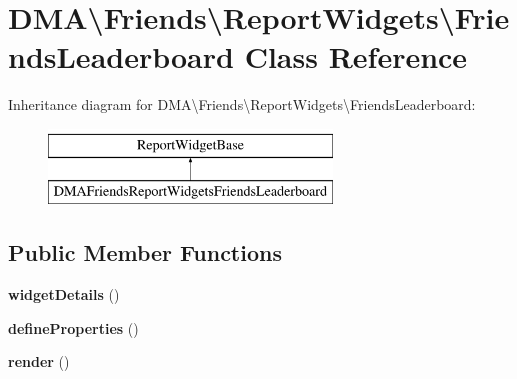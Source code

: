 \hypertarget{classDMA_1_1Friends_1_1ReportWidgets_1_1FriendsLeaderboard}{\section{D\-M\-A\textbackslash{}Friends\textbackslash{}Report\-Widgets\textbackslash{}Friends\-Leaderboard Class Reference}
\label{classDMA_1_1Friends_1_1ReportWidgets_1_1FriendsLeaderboard}
}
Inheritance diagram for D\-M\-A\textbackslash{}Friends\textbackslash{}Report\-Widgets\textbackslash{}Friends\-Leaderboard\-:\begin{figure}[H]
\begin{center}
\leavevmode
\includegraphics[height=2.000000cm]{dd/dbd/classDMA_1_1Friends_1_1ReportWidgets_1_1FriendsLeaderboard}
\end{center}
\end{figure}
\subsection*{Public Member Functions}
\begin{DoxyCompactItemize}
\item 
\hypertarget{classDMA_1_1Friends_1_1ReportWidgets_1_1FriendsLeaderboard_ac5fc1d8631aca255dee64a37ddeed5f6}{{\bfseries widget\-Details} ()}\label{classDMA_1_1Friends_1_1ReportWidgets_1_1FriendsLeaderboard_ac5fc1d8631aca255dee64a37ddeed5f6}

\item 
\hypertarget{classDMA_1_1Friends_1_1ReportWidgets_1_1FriendsLeaderboard_a8a2b873a91fc33c558834423e35da4bc}{{\bfseries define\-Properties} ()}\label{classDMA_1_1Friends_1_1ReportWidgets_1_1FriendsLeaderboard_a8a2b873a91fc33c558834423e35da4bc}

\item 
\hypertarget{classDMA_1_1Friends_1_1ReportWidgets_1_1FriendsLeaderboard_acc5889523847a95eb855e6041c5ef92f}{{\bfseries render} ()}\label{classDMA_1_1Friends_1_1ReportWidgets_1_1FriendsLeaderboard_acc5889523847a95eb855e6041c5ef92f}

\end{DoxyCompactItemize}
